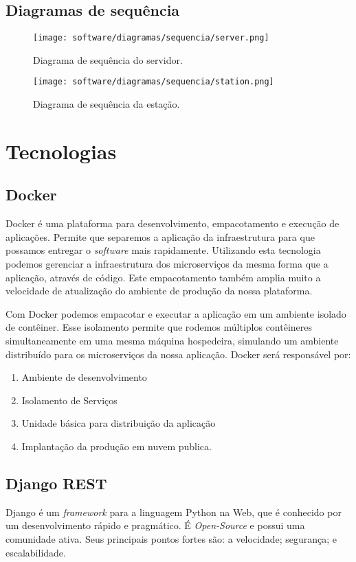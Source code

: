     \subsection{Diagramas de sequência}

    \begin{figure}[H]
    	\centering
        \texttt{[image: software/diagramas/sequencia/server.png]}
        \caption{Diagrama de sequência do servidor.}
        \label{fig:sequence_server}
    \end{figure}

    \begin{figure}[H]
        \texttt{[image: software/diagramas/sequencia/station.png]}
        \caption{Diagrama de sequência da estação.}
        \label{fig:sequence_station}
    \end{figure}

	\section{Tecnologias}
	\subsection{Docker}
	Docker é uma plataforma para desenvolvimento, empacotamento e execução de aplicações. Permite que separemos a aplicação da infraestrutura para que possamos entregar o \textit{software} mais rapidamente. Utilizando esta tecnologia podemos gerenciar a infraestrutura dos microserviços da mesma forma que a aplicação, através de código. Este empacotamento também amplia muito a velocidade de atualização do ambiente de produção da nossa plataforma.
	
	Com Docker podemos empacotar e executar a aplicação em um ambiente isolado de contêiner. Esse isolamento permite que rodemos múltiplos contêineres simultaneamente em uma mesma máquina hospedeira, simulando um ambiente distribuído para os microserviços da nossa aplicação.
	Docker será responsável por:
	\begin{enumerate}
		\item Ambiente de desenvolvimento
		\item Isolamento de Serviços
		\item Unidade básica para distribuição da aplicação 
		\item Implantação da produção em nuvem publica.
	\end{enumerate}

	\subsection{Django REST}
		Django é um \textit{framework} para a linguagem Python na Web, que é conhecido por um desenvolvimento rápido e pragmático. É \textit{Open-Source} e possui uma comunidade ativa. Seus principais pontos fortes são: a velocidade; segurança; e escalabilidade.
		
